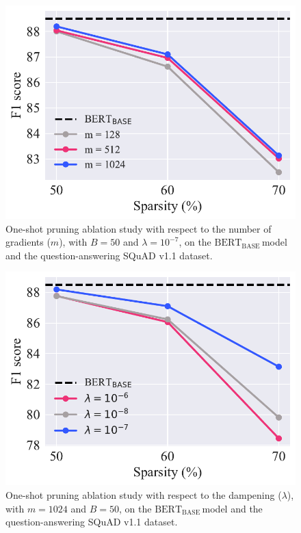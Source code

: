 \documentclass[11pt]{article}
\newcommand{\bert}{$\textrm{BERT}_{\textrm{BASE}}\,$}
\begin{document}
\begin{figure}
    \centering
    \includegraphics[scale=0.5]{media/ablation_m.pdf}
    \caption{One-shot pruning ablation study with respect to the number of gradients ($m$), with $B = 50$ and $\lambda = 10^{-7}$, on the \bert model and the question-answering SQuAD v1.1 dataset.}
    \label{fig:ablation_m}
\end{figure}

\begin{figure}
    \centering
    \includegraphics[scale=0.5]{media/ablation_damp.pdf}
    \caption{One-shot pruning ablation study with respect to the dampening ($\lambda$), with $m = 1024$ and $B = 50$, on the \bert model and the question-answering SQuAD v1.1 dataset.}
    \label{fig:ablation_damp}
\end{figure}
\end{document}
